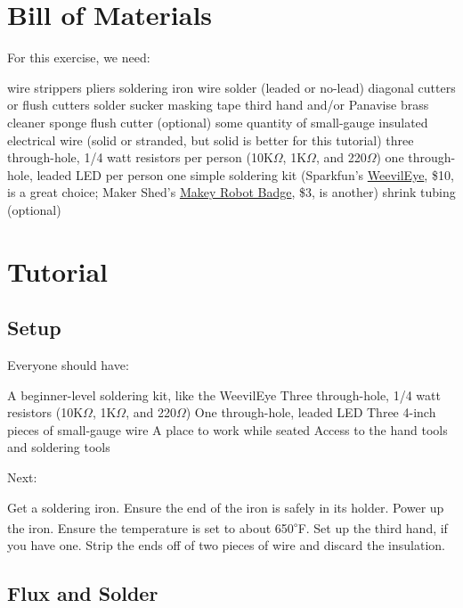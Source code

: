 \documentclass[12pt]{article}
\newcommand{\degs}[1]{\textsuperscript{$\circ$}#1}
\begin{document}
\newpage

\section{Bill of Materials}

For this exercise, we need:
\begin{enumerate}
\+ wire strippers
\+ pliers
\+ soldering iron
\+ wire solder (leaded or no-lead)
\+ diagonal cutters or flush cutters
\+ solder sucker
\+ masking tape
\+ third hand and/or Panavise
\+ brass cleaner sponge
\+ flush cutter (optional)
\+ some quantity of small-gauge insulated electrical wire (solid or stranded, but solid is better for this tutorial)
\+ three through-hole, 1/4 watt resistors per person (10K$\Omega$, 1K$\Omega$, and 220$\Omega$)
\+ one through-hole, leaded LED per person
\+ one simple soldering kit (Sparkfun's {\color{webblue}\href{https://www.sparkfun.com/products/10723}{WeevilEye}}, \$10, is a great choice; Maker Shed's {\color{webblue}\href{http://www.makershed.com/products/learn-to-solder-skill-badge-kit}{Makey Robot Badge}}, \$3, is another)
\+ shrink tubing (optional)
\end{enumerate}


\newpage
\section{Tutorial}

\subsection{Setup}

Everyone should have:

\begin{enumerate}
\+ A beginner-level soldering kit, like the WeevilEye
\+ Three through-hole, 1/4 watt resistors (10K$\Omega$, 1K$\Omega$, and 220$\Omega$)
\+ One through-hole, leaded LED
\+ Three 4-inch pieces of small-gauge wire
\+ A place to work while seated
\+ Access to the hand tools and soldering tools
\end{enumerate}

Next:

Get a soldering iron. Ensure the end of the iron is safely in its holder. Power up the iron. Ensure the temperature is set to about 650\degs{F}.  Set up the third hand, if you have one. Strip the ends off of two pieces of wire and discard the insulation.

\subsection{Flux and Solder}
\end{document}
